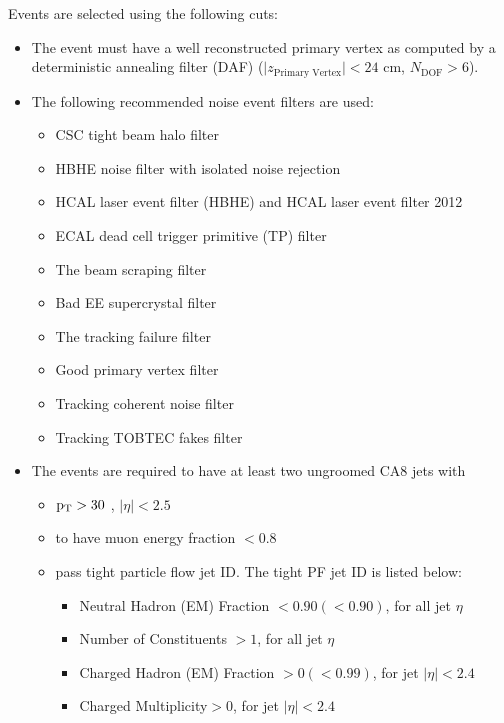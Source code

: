 Events are selected using the following cuts:
\begin{itemize}
\item The event must have a well reconstructed primary vertex as computed by a deterministic annealing filter (DAF)
($\vert z_\text{Primary Vertex}\vert < 24$ cm, $N_\text{DOF} > 6$).
\item The following recommended noise event filters are used:
       \begin{itemize}
          \item  CSC tight beam halo filter
          \item  HBHE noise filter with isolated noise rejection
          \item  HCAL laser event filter (HBHE) and HCAL laser event filter 2012
          \item  ECAL dead cell trigger primitive (TP) filter
          \item  The beam scraping filter
          \item  Bad EE supercrystal filter
          \item  The tracking failure filter
          \item  Good primary vertex filter 
	  \item  Tracking coherent noise filter
	  \item  Tracking TOBTEC fakes filter  
       \end{itemize}
\item The events are required to have at least two ungroomed CA8 jets with
        \begin{itemize}
          \item $\mathrm{p_{T}} > 30$ \GeVcc, $|\eta| < 2.5$
          \item  to have muon energy fraction $< 0.8$
          \item pass tight particle flow jet ID. The tight PF jet ID is listed below:
                 \begin{itemize}
                     \item   Neutral Hadron (EM) Fraction $< 0.90 (< 0.90)$, for all jet $\eta$
                     \item   Number of Constituents $> 1$, for all jet $\eta$
                     \item   Charged Hadron (EM) Fraction $> 0 (< 0.99)$, for jet $|\eta| < 2.4$
                     \item   Charged Multiplicity$ > 0$, for jet $|\eta| < 2.4$
                 \end{itemize}

\end{itemize}
\end{itemize}
